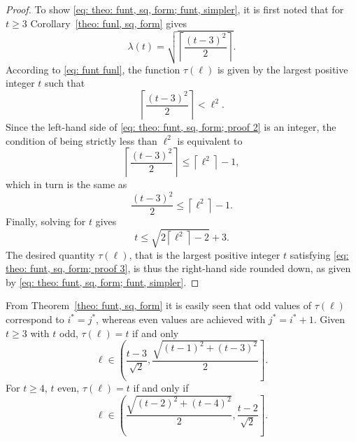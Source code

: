 \documentclass[12pt, a4paper]{article}
\newcommand{\funt}{\tau} %
\newcommand{\funl}{\lambda} %
\newcommand{\len}{\ell} %
\newcommand{\tiles}{t} %
\newcommand{\isoli}{i^\ast}
\newcommand{\jsoli}{j^\ast}
\begin{document}
\begin{proof}
To show \eqref{eq: theo: funt, sq, form; funt, simpler}, it is first noted that for $\tiles \geq 3$ Corollary~\ref{theo: funl, sq, form} gives
\begin{equation}
\funl(\tiles) = \sqrt{\left\lceil \frac{(\tiles-3)^2} {2} \right\rceil}.
\end{equation}
According to \eqref{eq: funt funl}, the function $\funt(\len)$ is given by the largest positive integer $t$ such that 
\begin{equation}
\label{eq: theo: funt, sq, form; proof 2}
\left\lceil \frac{(\tiles-3)^2} {2} \right\rceil < \len ^ 2.
\end{equation}
Since the left-hand side of \eqref{eq: theo: funt, sq, form; proof 2} is an integer, the condition of being strictly less than $\len^2$ is equivalent to
\begin{equation}
\left\lceil \frac{(\tiles-3)^2} {2} \right\rceil  \leq \left\lceil \len^2 \right\rceil  - 1,
\end{equation}
which in turn is the same as
\begin{equation}
\frac{(\tiles-3)^2} {2}\leq  \left\lceil \len^2 \right\rceil  - 1. 
\end{equation}
Finally, solving for $\tiles$ gives
\begin{equation}
\label{eq: theo: funt, sq, form; proof 3}
\tiles \leq \sqrt{2 \left\lceil \len^2 \right\rceil -2 } + 3.
\end{equation}
The desired quantity $\funt(\len)$, that is the largest positive integer $\tiles$ satisfying \eqref{eq: theo: funt, sq, form; proof 3}, is thus the right-hand side rounded down, as given by \eqref{eq: theo: funt, sq, form; funt, simpler}.
\end{proof}

From Theorem~\ref{theo: funt, sq, form} it is easily seen that odd values of $\funt(\len)$ correspond to $\isoli = \jsoli$, whereas even values are achieved with $\jsoli = \isoli+1$. Given $\tiles \geq 3$ with $\tiles$ odd, $\funt(\len) = \tiles$ if and only
\begin{equation}
\label{eq: square, odd max tiles, lengths}
\len \in \left( \frac{\tiles-3}{\sqrt{2}}, \frac{ \sqrt{(\tiles-1)^2+(\tiles-3)^2}}{2} \right].
\end{equation}
For $\tiles \geq 4$, $\tiles$ even, $\funt(\len) = \tiles$ if and only if
\begin{equation}
\label{eq: square, even max tiles, lengths}
\len \in \left(\frac{ \sqrt{(\tiles-2)^2+(\tiles-4)^2}}{2}, \frac{\tiles-2}{\sqrt{2}} \right].
\end{equation}
\end{document}
